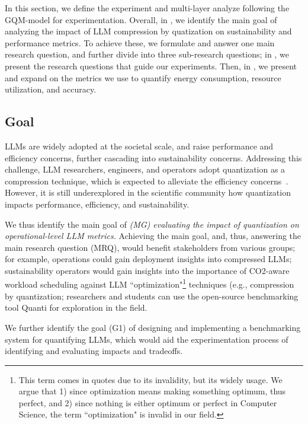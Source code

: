 In this section, we define the experiment and multi-layer analyze following the GQM-model for experimentation. Overall, in , we identify the main goal of analyzing the impact of LLM compression by quatization on sustainability and performance metrics. To achieve these, we formulate and answer one main research question, and further divide into three sub-research questions; in , we present the research questions that guide our experiments. Then, in , we present and expand on the metrics we use to quantify energy consumption, resource utilization, and accuracy.

\subsection{Goal}\label{sec:experiment:goal}
LLMs are widely adopted at the societal scale, and raise performance and efficiency concerns, further cascading into sustainability concerns. Addressing this challenge, LLM researchers, engineers, and operators adopt quantization as a compression technique, which is expected to alleviate the efficiency concerns~\cite{zhang2023dual, DBLP:conf/icml/NagelABLB20}. However, it is still underexplored in the scientific community how quantization impacts performance, efficiency, and sustainability. 

We thus identify the main goal of 
\textit{(MG) evaluating the impact of quantization on operational-level LLM metrics.} Achieving the main goal, and, thus, answering the main research question (MRQ), would benefit stakeholders from various groups; for example, operations could gain deployment insights into compressed LLMs; sustainability operators would gain insights into the importance of CO2-aware workload scheduling against LLM ``optimization"\footnote{This term comes in quotes due to its invalidity, but its widely usage. We argue that 1) since optimization means making something optimum, thus perfect, and 2) since nothing is either optimum or perfect in Computer Science, the term ``optimization" is invalid in our field.} techniques (e.g., compression by quantization; researchers and students can use the open-source benchmarking tool Quanti for exploration in the field.

We further identify the goal 
(G1) of designing and implementing a benchmarking system for quantifying LLMs, which would aid the experimentation process of identifying and evaluating impacts and tradeoffs.

